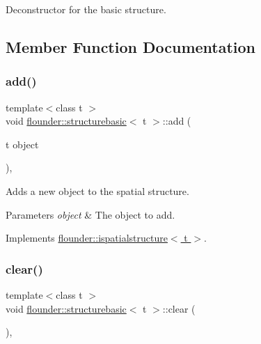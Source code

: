 Deconstructor for the basic structure. 



\subsection{Member Function Documentation}
\mbox{\label{classflounder_1_1structurebasic_a75d3685a3341fcaef9e28deaf1f2dcd2}} 
\subsubsection{\texorpdfstring{add()}{add()}}
{\footnotesize\ttfamily template$<$class t $>$ \\
void \hyperlink{classflounder_1_1structurebasic}{flounder\+::structurebasic}$<$ t $>$\+::add (\begin{DoxyParamCaption}\item[{t}]{object }\end{DoxyParamCaption})\hspace{0.3cm}{\ttfamily [override]}, {\ttfamily [virtual]}}



Adds a new object to the spatial structure. 


\begin{DoxyParams}{Parameters}
{\em object} & The object to add. \\
\hline
\end{DoxyParams}


Implements \hyperlink{classflounder_1_1ispatialstructure_abd7886a29a4c6ec867ec0f611f5a667b}{flounder\+::ispatialstructure$<$ t $>$}.

\mbox{\label{classflounder_1_1structurebasic_a080579359485a5b32489a004c70da095}} 
\subsubsection{\texorpdfstring{clear()}{clear()}}
{\footnotesize\ttfamily template$<$class t $>$ \\
void \hyperlink{classflounder_1_1structurebasic}{flounder\+::structurebasic}$<$ t $>$\+::clear (\begin{DoxyParamCaption}{ }\end{DoxyParamCaption})\hspace{0.3cm}{\ttfamily [override]}, {\ttfamily [virtual]}}



